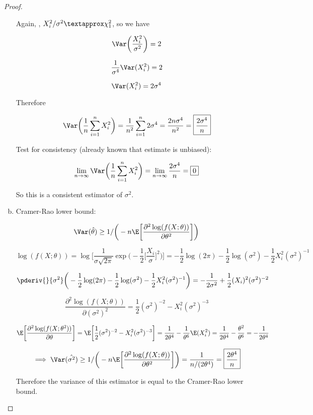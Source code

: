 \begin{proof}
\begin{enumerate}[a.]
Again, , \(X_i^2/\sigma^2 \textapprox \chi_1^2\), so we have

\[
\Var\bigg( \frac{X_i^2}{\sigma^2} \bigg) = 2
\]

\[
\frac{1}{\sigma^4} \Var(X_i^2) = 2
\]

\[
\Var(X_i^2) = 2 \sigma^4
\]

Therefore

\[
\Var \bigg( \frac{1}{n} \sum_{i=1}^n X_i^2 \bigg) = \frac{1}{n^2} \sum_{i=1}^n 2 \sigma^4 = \frac{2n\sigma^4}{n^2} = \boxed{ \frac{2 \sigma^4}{n}}
\]

Test for consistency (already known that estimate is unbiased):

\[
\lim_{n \to \infty} \Var \bigg( \frac{1}{n} \sum_{i=1}^n X_i^2 \bigg) = \lim_{n \to \infty} \frac{2 \sigma^4}{n} = \boxed{0}
\]

So this is a consistent estimator of \(\sigma^2\).

\item Cramer-Rao lower bound:

\[
\Var(\hat{\theta}) \geq 1/\bigg(-n \E \bigg[ \frac{\partial^2 \log(f(X; \theta))}{\partial \theta^2} \bigg] \bigg)
\]

\[
 \log(f(X; \theta)) = \log \bigg[ \frac{1}{\sigma \sqrt{2 \pi}} \exp\bigg(- \frac{1}{2} \bigg[\frac{X_i}{\sigma}\bigg]^2 \bigg) \bigg] = - \frac{1}{2} \log(2 \pi) -  \frac{1}{2} \log(\sigma^2) - \frac{1}{2}X_i^2 (\sigma^2)^{-1}
\]

\[
\pderiv{}{\sigma^2}\bigg( - \frac{1}{2} \log(2 \pi) -  \frac{1}{2} \log(\sigma^2) - \frac{1}{2}X_i^2 (\sigma^2)^{-1}\bigg) = -\frac{1}{2 \sigma^2} + \frac{1}{2}(X_i)^2 (\sigma^2)^{-2}
\]

\[
 \frac{\partial^2 \log(f(X; \theta))}{\partial (\sigma^2)^2} = \frac{1}{2}(\sigma^2)^{-2}  - X_i^2(\sigma^2)^{-3}
\]

\[
\E \bigg[  \frac{\partial^2 \log(f(X; \theta^2))}{\partial \theta}  \bigg] = \E \bigg[  \frac{1}{2}(\sigma^2)^{-2}  - X_i^2(\sigma^2)^{-3}  \bigg] = \frac{1}{2 \theta^4} - \frac{1}{\theta^6} \E(X_i^2) = \frac{1}{2 \theta^4} - \frac{\theta^2}{\theta^6} = -\frac{1}{2 \theta^4}
\]

\[
\implies \Var(\hat{\sigma^2}) \geq 1/\bigg(-n \E \bigg[ \frac{\partial^2 \log(f(X; \theta))}{\partial \theta^2} \bigg] \bigg) = \frac{1}{n/(2 \theta^4)} = \boxed{\frac{2 \theta^4}{n}}
\]

Therefore the variance of this estimator is equal to the Cramer-Rao lower bound.

\end{enumerate}

\end{proof}

